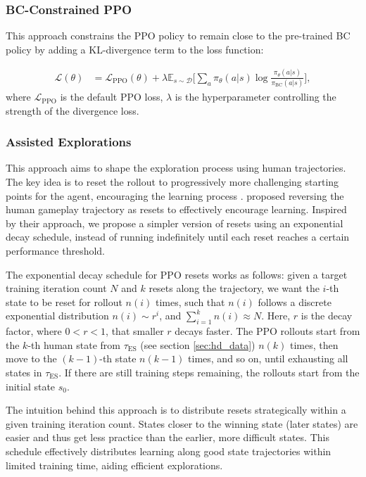 \documentclass{article}
\begin{document}
\subsubsection{BC-Constrained PPO}
This approach constrains the PPO policy to remain close to the pre-trained BC 
policy by adding a KL-divergence term to the loss function:

\begin{align*}
      \mathcal{L}(\theta) 
      &= \mathcal{L}_{\text{PPO}}(\theta) +
      \lambda \mathbb{E}_{s \sim \mathcal{D}} \bigg[ \sum_{a} \pi_{\theta}(a | s) \log 
      \frac{\pi_{\theta}(a | s)}{\pi_{\text{BC}}(a | s)} \bigg],
\end{align*}
where $\mathcal{L}_{\text{PPO}}$ is the default PPO loss, $\lambda$ is the hyperparameter
controlling the strength of the divergence loss.

\subsubsection{Assisted Explorations}
This approach aims to shape the exploration process using human trajectories. 
The key idea is to reset the rollout to progressively more challenging starting 
points for the agent, encouraging the learning process \cite{florensa2018reversecurriculumgenerationreinforcement}. 
\cite{salimans2018learningmontezumasrevengesingle} proposed reversing the human 
gameplay trajectory as resets to effectively encourage learning. Inspired by 
their approach, we propose a simpler version of resets using an exponential 
decay schedule, instead of running indefinitely until each reset reaches a 
certain performance threshold.

The exponential decay schedule for PPO resets works as follows: given a target 
training iteration count $N$ and $k$ resets along the trajectory, we want the 
$i$-th state to be reset for rollout $n(i)$ times, such that $n(i)$ follows a 
discrete exponential distribution $n(i) \sim r^i$, and $\sum_{i=1}^{k} n(i) 
\approx N$. Here, $r$ is the decay factor, where $0 < r < 1$, that smaller $r$ decays 
faster. The PPO rollouts start from the $k$-th human state from 
$\tau_{\text{ES}}$ (see section \ref{sec:hd_data}) $n(k)$ times, then move to 
the $(k-1)$-th state $n(k-1)$ times, and so on, until exhausting all states in 
$\tau_{\text{ES}}$. If there are still training steps remaining, the rollouts 
start from the initial state $s_0$.

The intuition behind this approach is to distribute resets strategically 
within a given training iteration count. States closer to the winning 
state (later states) are easier and thus get less practice than the 
earlier, more difficult states. This schedule effectively distributes 
learning along good state trajectories within limited training time, 
aiding efficient explorations.
\end{document}

